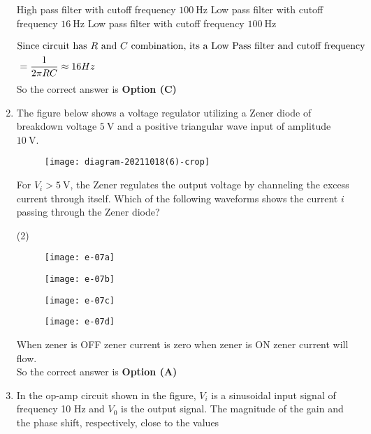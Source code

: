 \begin{enumerate}
\begin{tasks}
\task[\textbf{B.}] High pass filter with cutoff frequency $100 \mathrm{~Hz}$
\task[\textbf{C.}] Low pass filter with cutoff frequency $16 \mathrm{~Hz}$
\task[\textbf{D.}] Low pass filter with cutoff frequency $100 \mathrm{~Hz}$
\end{tasks}
\begin{answer}
\begin{align*}
\intertext{Since circuit has $R$ and $C$ combination, its a Low Pass filter and cutoff frequency}
&=\frac{1}{2 \pi R C} \approx 16 H z
\end{align*}
So the correct answer is \textbf{Option (C)}
\end{answer}
	\item The figure below shows a voltage regulator utilizing a Zener diode of breakdown voltage $5 \mathrm{~V}$ and a positive triangular wave input of amplitude $10 \mathrm{~V}$.\\
	\begin{figure}[H]
		\centering
		\texttt{[image: diagram-20211018(6)-crop]}
	\end{figure}
	For $V_{i}>5 \mathrm{~V}$, the Zener regulates the output voltage by channeling the excess current through itself. Which of the following waveforms shows the current $i$ passing through the Zener diode?
\begin{tasks}(2)
\task[\textbf{A.}] \begin{figure}[H]
	\centering
	\texttt{[image: e-07a]}
\end{figure}
\task[\textbf{B.}] \begin{figure}[H]
	\centering
	\texttt{[image: e-07b]}
\end{figure}
\task[\textbf{C.}] \begin{figure}[H]
	\centering
	\texttt{[image: e-07c]}
\end{figure}
\task[\textbf{D.}] \begin{figure}[H]
	\centering
	\texttt{[image: e-07d]}
\end{figure}
\end{tasks}
\begin{answer}$\left. \right. $\\
When zener is OFF zener current is zero when zener is $\mathrm{ON}$ zener current will flow.\\
So the correct answer is \textbf{Option (A)}
\end{answer}
	\item In the op-amp circuit shown in the figure, $V_{i}$ is a sinusoidal input signal of frequency 10 $\mathrm{Hz}$ and $V_{0}$ is the output signal. The magnitude of the gain and the phase shift, respectively, close to the values

\end{enumerate}
